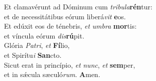 \oddverse Et clamavérunt ad Dóminum cum \textit{tri}\textit{bu}\textit{la}\textbf{rén}tur:~\*\\
\oddverse et de necessitátibus eórum liberá\textit{vit} \textbf{e}os.\\
\evenverse Et edúxit eos de ténebris, \textit{et} \textit{um}\textit{bra} \textbf{mor}tis:~\*\\
\evenverse et víncula eórum \textit{dis}\textbf{rú}pit.\\
\oddverse Glória \textit{Pa}\textit{tri}, \textit{et} \textbf{Fí}lio,~\*\\
\oddverse et Spirítu\textit{i} \textbf{San}cto.\\
\evenverse Sicut erat in princípio, \textit{et} \textit{nunc}, \textit{et} \textbf{sem}per,~\*\\
\evenverse et in sǽcula sæculó\textit{rum}. \textbf{A}men.\\
